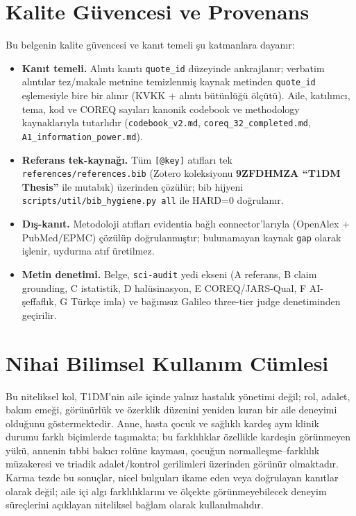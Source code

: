\documentclass[
  turkish,
  a4paper,
  DIV=11,
  numbers=noendperiod]{scrreprt}
\providecommand{\tightlist}{%
  \setlength{\itemsep}{0pt}\setlength{\parskip}{0pt}}
\begin{document}
\chapter{Kalite Güvencesi ve Provenans}\label{sec-dogrulama}

Bu belgenin kalite güvencesi ve kanıt temeli şu katmanlara dayanır:

\begin{itemize}
\tightlist
\item
  \textbf{Kanıt temeli.} Alıntı kanıtı \texttt{quote\_id} düzeyinde
  ankrajlanır; verbatim alıntılar tez/makale metnine temizlenmiş kaynak
  metinden \texttt{quote\_id} eşlemesiyle bire bir alınır (KVKK + alıntı
  bütünlüğü ölçütü). Aile, katılımcı, tema, kod ve COREQ sayıları
  kanonik codebook ve methodology kaynaklarıyla tutarlıdır
  (\texttt{codebook\_v2.md}, \texttt{coreq\_32\_completed.md},
  \texttt{A1\_information\_power.md}).
\item
  \textbf{Referans tek-kaynağı.} Tüm \texttt{{[}@key{]}} atıfları tek
  \texttt{references/references.bib} (Zotero koleksiyonu
  \textbf{9ZFDHMZA ``T1DM Thesis''} ile mutabık) üzerinden çözülür; bib
  hijyeni \texttt{scripts/util/bib\_hygiene.py\ all} ile HARD=0
  doğrulanır.
\item
  \textbf{Dış-kanıt.} Metodoloji atıfları evidentia bağlı
  connector'larıyla (OpenAlex + PubMed/EPMC) çözülüp doğrulanmıştır;
  bulunamayan kaynak \texttt{gap} olarak işlenir, uydurma atıf
  üretilmez.
\item
  \textbf{Metin denetimi.} Belge, \texttt{sci-audit} yedi ekseni (A
  referans, B claim grounding, C istatistik, D halüsinasyon, E
  COREQ/JARS-Qual, F AI-şeffaflık, G Türkçe imla) ve bağımsız Galileo
  three-tier judge denetiminden geçirilir.
\end{itemize}

\chapter{Nihai Bilimsel Kullanım Cümlesi}\label{sec-nihai}

Bu niteliksel kol, T1DM'nin aile içinde yalnız hastalık yönetimi değil;
rol, adalet, bakım emeği, görünürlük ve özerklik düzenini yeniden kuran
bir aile deneyimi olduğunu göstermektedir. Anne, hasta çocuk ve sağlıklı
kardeş aynı klinik durumu farklı biçimlerde taşımakta; bu farklılıklar
özellikle kardeşin görünmeyen yükü, annenin tıbbi bakıcı rolüne kayması,
çocuğun normalleşme--farklılık müzakeresi ve triadik adalet/kontrol
gerilimleri üzerinden görünür olmaktadır. Karma tezde bu sonuçlar, nicel
bulguları ikame eden veya doğrulayan kanıtlar olarak değil; aile içi
algı farklılıklarını ve ölçekte görünmeyebilecek deneyim süreçlerini
açıklayan niteliksel bağlam olarak kullanılmalıdır.
\end{document}
